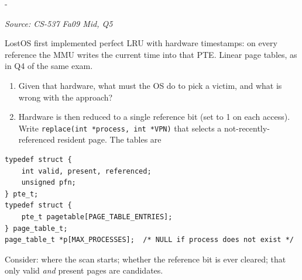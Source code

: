 \documentclass[11pt,a4paper]{article}
\makeatletter
\newcommand{\keepspace}[1]{\par\penalty-100\begingroup
  \setlength{\dimen@}{#1}\dimen@ii\pagegoal\advance\dimen@ii-\pagetotal
  \ifdim\dimen@>\dimen@ii\ifdim\dimen@ii>\z@\vfil\fi\break\fi\endgroup}
\newcounter{qn}[section]
\newenvironment{Qn}[4]{%
  \refstepcounter{qn}\keepspace{7\baselineskip}%
  \begin{tcolorbox}[qboxstyle, title={Q\thesection.\theqn\ \ [#1 \textbar\ #2]\ \ #4}]%
  {\footnotesize\color{g3}\textit{Source: #3}}\par\smallskip%
}{%
  \end{tcolorbox}%
}
\makeatother
\begin{document}
\begin{Qn}{Hard}{Lect 15}{CS-537 Fa09 Mid, Q5}{Perfect LRU via timestamps, then a second-chance \texttt{replace()}}
LostOS first implemented perfect LRU with hardware timestamps: on every
reference the MMU writes the current time into that PTE. Linear page
tables, as in Q4 of the same exam.
\begin{enumerate}
  \item[(a)] Given that hardware, what must the OS do to pick a victim,
        and what is wrong with the approach?
  \item[(b)] Hardware is then reduced to a single reference bit (set to 1
        on each access). Write \texttt{replace(int *process, int *VPN)}
        that selects a not-recently-referenced resident page. The
        tables are
\end{enumerate}
\begin{lstlisting}[numbers=none]
typedef struct {
    int valid, present, referenced;
    unsigned pfn;
} pte_t;
typedef struct {
    pte_t pagetable[PAGE_TABLE_ENTRIES];
} page_table_t;
page_table_t *p[MAX_PROCESSES];  /* NULL if process does not exist */
\end{lstlisting}
Consider: where the scan starts; whether the reference bit is ever
cleared; that only valid \emph{and} present pages are candidates.
\end{Qn}
\end{document}
